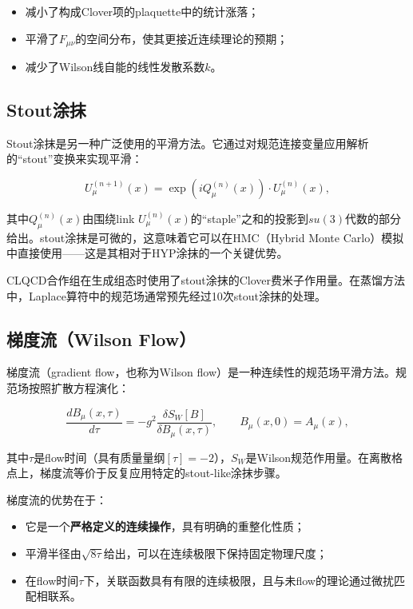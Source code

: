 \documentclass[12pt,a4paper]{ctexart}
\theoremstyle{definition}
\begin{document}
\begin{itemize}
    \item 减小了构成Clover项的plaquette中的统计涨落；
    \item 平滑了$F_{\mu\nu}$的空间分布，使其更接近连续理论的预期；
    \item 减少了Wilson线自能的线性发散系数$k$。
\end{itemize}

\subsection{Stout涂抹}

Stout涂抹是另一种广泛使用的平滑方法\cite{CLQCD2024,CLQCD2025}。它通过对规范连接变量应用解析的``stout''变换来实现平滑：

\begin{equation}
U_\mu^{(n+1)}(x) = \exp(iQ_\mu^{(n)}(x)) \cdot U_\mu^{(n)}(x),
\label{eq:stout}
\end{equation}

其中$Q_\mu^{(n)}(x)$由围绕link $U_\mu^{(n)}(x)$的``staple''之和的投影到$su(3)$代数的部分给出。stout涂抹是可微的，这意味着它可以在HMC（Hybrid Monte Carlo）模拟中直接使用——这是其相对于HYP涂抹的一个关键优势。

CLQCD合作组在生成组态时使用了stout涂抹的Clover费米子作用量\cite{CLQCD2024,CLQCD2025}。在蒸馏方法中，Laplace算符中的规范场通常预先经过10次stout涂抹的处理\cite{Egerer2021a}。

\subsection{梯度流（Wilson Flow）}

梯度流（gradient flow，也称为Wilson flow）是一种连续性的规范场平滑方法。规范场按照扩散方程演化：

\begin{equation}
\frac{dB_\mu(x,\tau)}{d\tau} = -g^2 \frac{\delta S_W[B]}{\delta B_\mu(x,\tau)}, \qquad B_\mu(x,0) = A_\mu(x),
\label{eq:wilson_flow}
\end{equation}

其中$\tau$是flow时间（具有质量量纲$[\tau] = -2$），$S_W$是Wilson规范作用量。在离散格点上，梯度流等价于反复应用特定的stout-like涂抹步骤。

梯度流的优势在于\cite{NieMiera2025,Chen2025gluon}：
\begin{itemize}
    \item 它是一个\textbf{严格定义的连续操作}，具有明确的重整化性质；
    \item 平滑半径由$\sqrt{8\tau}$给出，可以在连续极限下保持固定物理尺度；
    \item 在flow时间$\tau$下，关联函数具有有限的连续极限，且与未flow的理论通过微扰匹配相联系。
\end{itemize}
\end{document}
